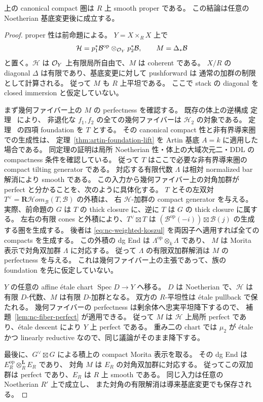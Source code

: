 \begin{proposition}\label{prop:nc-relative-smooth}
上の canonical compact 圏は $R$ 上 smooth proper である。
この結論は任意の Noetherian 基底変更後に成立する。
\end{proposition}

\begin{proof}
proper 性は前命題による。
$Y=X\times_R X$ 上で
\[
 \mathcal H=p_1^*\mathcal B^{\mathrm{op}}\otimes_{\mathcal O_Y}p_2^*\mathcal B,
 \qquad M=\Delta_*\mathcal B
\]
と置く。$\mathcal H$ は $\mathcal O_Y$ 上有限局所自由で、$M$ は coherent である。
$X/R$ の diagonal $\Delta$ は有限であり、基底変更に対して pushforward は
通常の加群の制限として計算される。
従って $M$ も $R$ 上平坦である。
ここで stack の diagonal を closed immersion と仮定していない。

まず幾何ファイバー上の $M$ の perfectness を確認する。
既存の体上の逆構成
定理~\cite[\texttt{thm:ore-anticommuting-central}]{QuadricIntrinsic2026} により、
非退化な $f_1,f_2$ の全ての幾何ファイバーは $\mathcal H_2$ の対象である。
定理~\cite[\texttt{thm:normal-helix}]{QuadricIntrinsic2026} の四項 foundation を $T$ とする。
その canonical compact 性と非有界導来圏での生成性は、
定理~\ref{thm:artin-foundation-lift} を Artin 基底 $A=k$ に適用した場合である。
同定理の証明は局所 Noetherian 性・体上の大域次元二・DDL の compactness 条件を確認している。
従って $T$ はここで必要な非有界導来圏の compact tilting generator である。
対応する有限代数 $\Lambda$ は相対 normalized bar 解消により smooth である。
この入力から幾何ファイバー上の対角加群が perfect と分かることを、次のように具体化する。
$T$ とその左双対 $T^\vee=\mathbf R\mathcal Hom_{\mathcal B}(T,\mathcal B)$ の外積は、
右 $\mathcal H$-加群の compact generator を与える。
実際、前命題の $G$ は $T$ の thick closure に、逆に $T$ は $G$ の thick closure に属する。
左右の有限 cones と外積により、$T^\vee\boxtimes T$ は
$(\mathcal B^{\mathrm{op}}(-i))\boxtimes\mathcal B(j)$ の生成する圏を生成する。
後者は \eqref{eq:nc-weighted-koszul} を両因子へ適用すれば全ての compacts を生成する。
この外積の dg End は $\Lambda^{\mathrm{op}}\otimes_k\Lambda$ であり、
$M$ は Morita 表示で対角双加群 $\Lambda$ に対応する。
従って $\Lambda$ の有限双加群解消は $M$ の perfectness を与える。
これは幾何ファイバー上の主張であって、族の foundation を先に仮定していない。

$Y$ の任意の affine étale chart $\operatorname{Spec} D\to Y$ へ移る。
$D$ は Noetherian で、$\mathcal H$ は有限 $D$-代数、$M$ は有限 $D$-加群となる。
双方の $R$-平坦性は étale pullback で保たれる。
幾何ファイバーの perfectness は剰余体へ忠実平坦降下するので、
補題~\ref{lem:nc-fiber-perfect} が適用できる。
従って $M$ は $\mathcal H$ 上局所 perfect であり、étale descent により $Y$ 上 perfect である。
重み二の chart では $\mu_2$ が étale かつ linearly reductive なので、同じ議論がそのまま降下する。

最後に、$G^\vee\boxtimes G$ による積上の compact Morita 表示を取る。
その dg End は $E_R^{\mathrm{op}}\otimes_R^{\mathbf L}E_R$ であり、
対角 $M$ は $E_R$ の対角双加群に対応する。
従ってこの双加群は perfect であり、$E_R$ は $R$ 上 smooth である。
同じ入力は任意の Noetherian $R'$ 上で成立し、
また対角の有限解消は導来基底変更でも保存される。
\end{proof}

